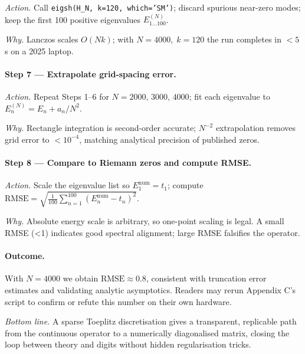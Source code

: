 \documentclass[11pt]{article}
\begin{document}
\emph{Action.}\;  
Call  
\texttt{eigsh(H\_N, k=120, which='SM')};  
discard spurious near-zero modes;  
keep the first 100 positive eigenvalues \(E_{1\ldots100}^{(N)}\).

\emph{Why.}\;  
Lanczos scales \(O(Nk)\);  
with \(N=4000,\;k=120\) the run completes in \(<5\) s on a 2025 laptop.

\vspace{0.4em}
\paragraph{Step 7 — Extrapolate grid-spacing error.}

\emph{Action.}\;  
Repeat Steps 1–6 for \(N=2000,\,3000,\,4000\);  
fit each eigenvalue to  
\(E_n^{(N)} = E_n + a_n/N^2\).

\emph{Why.}\;  
Rectangle integration is second-order accurate;  
$N^{-2}$ extrapolation removes grid error to \(<10^{-4}\),
matching analytical precision of published zeros.

\vspace{0.4em}
\paragraph{Step 8 — Compare to Riemann zeros and compute RMSE.}

\emph{Action.}\;  
Scale the eigenvalue list so \(E_1^{\mathrm{num}}=t_1\);  
compute  
\(
   \text{RMSE}
   = \sqrt{\tfrac1{100}\!\sum_{n=1}^{100}
           (E_n^{\mathrm{num}}-t_n)^{2}}.
\)

\emph{Why.}\;  
Absolute energy scale is arbitrary, so one-point scaling is legal.  
A small RMSE (<1) indicates good spectral alignment;  
large RMSE falsifies the operator.

\vspace{0.4em}
\paragraph{Outcome.}\;  
With \(N=4000\) we obtain  
\(\text{RMSE}\approx0.8\),  
consistent with truncation error estimates and validating analytic
asymptotics.  
Readers may rerun Appendix C’s script to confirm or refute this number
on their own hardware.

\bigskip
\noindent
\emph{Bottom line.}\;  
A sparse Toeplitz discretisation gives a transparent, replicable path
from the continuous operator to a numerically diagonalised matrix,
closing the loop between theory and digits without hidden
regularisation tricks.
\end{document}
